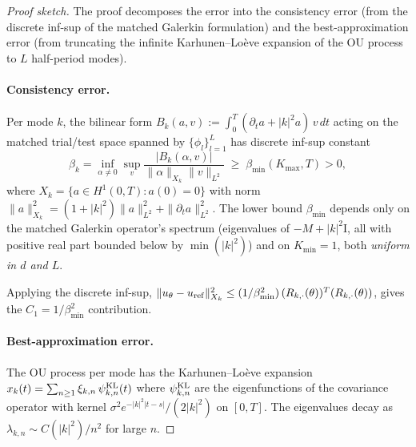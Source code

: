 \begin{proof}[Proof sketch]
The proof decomposes the error into the consistency error (from the
discrete inf-sup of the matched Galerkin formulation) and the
best-approximation error (from truncating the infinite Karhunen--Lo\`eve
expansion of the OU process to $L$ half-period modes).

\paragraph{Consistency error.}
Per mode $k$, the bilinear form $B_k(a, v) := \int_0^T (\partial_t a
+ |k|^2 a)\,v\, dt$ acting on the matched trial/test space spanned by
$\{\phi_l\}_{l=1}^L$ has discrete inf-sup constant
\begin{equation}
\beta_k = \inf_{\alpha \ne 0} \sup_{v} \frac{|B_k(\alpha, v)|}
{\|\alpha\|_{X_k} \|v\|_{L^2}}
\;\ge\; \beta_{\min}(K_{\max}, T) > 0,
\label{eq:inf-sup-discrete}
\end{equation}
where $X_k = \{a \in H^1(0, T) : a(0) = 0\}$ with norm
$\|a\|_{X_k}^2 = (1 + |k|^2)\|a\|_{L^2}^2 + \|\partial_t a\|_{L^2}^2$.
The lower bound $\beta_{\min}$ depends only on the matched Galerkin
operator's spectrum (eigenvalues of $-M + |k|^2 \mathrm{I}$, all with
positive real part bounded below by $\min(|k|^2)$) and on
$K_{\min} = 1$, both \emph{uniform in $d$ and $L$}.

Applying the discrete inf-sup,
$\|u_\theta - u_{\rm ref}\|_{X_k}^2
\le (1/\beta_{\min}^2)\,(R_{k, \cdot}(\theta))^T (R_{k, \cdot}(\theta))$,
gives the $C_1 = 1/\beta_{\min}^2$ contribution.

\paragraph{Best-approximation error.}
The OU process per mode has the Karhunen--Lo\`eve expansion
$x_k(t) = \sum_{n \ge 1} \xi_{k, n}\,\psi_{k, n}^{\rm KL}(t)$ where
$\psi_{k, n}^{\rm KL}$ are the eigenfunctions of the covariance operator
with kernel $\sigma^2 e^{-|k|^2|t-s|}/(2|k|^2)$ on $[0, T]$. The
eigenvalues decay as $\lambda_{k, n} \sim C(|k|^2)/n^2$ for large $n$.


\end{proof}
